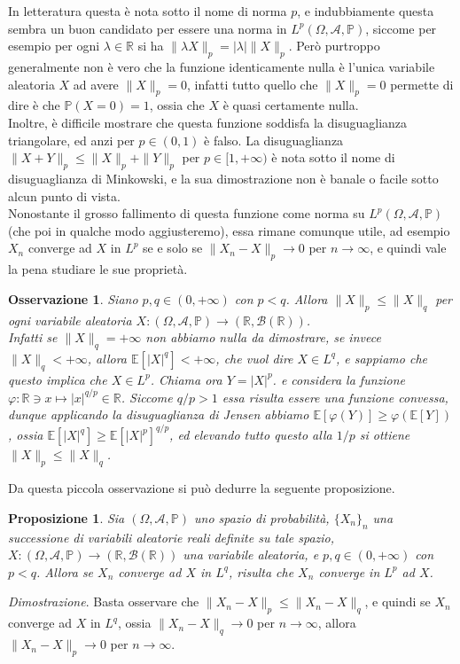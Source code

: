 \documentclass[11pt]{book}
\makeatletter
\theoremstyle{Definizione}
\theoremstyle{TeoremaProposizioneLemmaCorollario}
\newtheorem{mypropo}[myteo]{Proposizione}
\theoremstyle{OsservazioneNota}
\newtheorem{myobs}{Osservazione}[section]
\renewenvironment{proof}[1][\proofname]{\par
  \normalfont \topsep6\p@\@plus6\p@\relax
  \trivlist
  \item[\hskip\labelsep
        \itshape
    #1\@addpunct{.}]\ignorespaces
}{%
  \endtrivlist\@endpefalse
}
\newcommand{\R}{\mathbb{R}}
\renewcommand{\P}{\mathbb{P}}
\newcommand{\E}{\mathbb{E}}
\renewenvironment{proof}{\textsl{Dimostrazione}.}{}
\makeatother
\begin{document}
\noindent
In letteratura questa è nota sotto il nome di norma $p$, e indubbiamente questa sembra un buon candidato per essere una norma in $L^p(\Omega,\mathcal{A},\P)$, siccome per esempio per ogni $\lambda\in \R$ si ha $\| \lambda X\|_p = |\lambda| \|X\|_p$. Però purtroppo generalmente non è vero che la funzione identicamente nulla è l'unica variabile aleatoria $X$ ad avere $\|X\|_p = 0$, infatti tutto quello che $\|X\|_p = 0$ permette di dire è che $\P(X = 0) = 1$, ossia che $X$ è quasi certamente nulla.\\
Inoltre, è difficile mostrare che questa funzione soddisfa la disuguaglianza triangolare, ed anzi per $p\in (0,1)$ è falso. La disuguaglianza $\|X+Y\|_p \leq \|X\|_p+\|Y\|_p$ per $p\in [1,+\infty)$ è nota sotto il nome di disuguaglianza di Minkowski, e la sua dimostrazione non è banale o facile sotto alcun punto di vista.\\
Nonostante il grosso fallimento di questa funzione come norma su $L^p(\Omega,\mathcal{A},\P)$ (che poi in qualche modo aggiusteremo), essa rimane comunque utile, ad esempio $X_n$ converge ad $X$ in $L^p$ se e solo se $\|X_n-X\|_p \to 0$ per $n\to \infty$, e quindi vale la pena studiare le sue proprietà.
\begin{myobs}
Siano $p,q\in (0,+\infty)$ con $p<q$. Allora $\|X\|_p \leq \|X\|_q$ per ogni variabile aleatoria $X:(\Omega,\mathcal{A},\P) \longrightarrow (\R,\mathcal{B}(\R))$.\\
Infatti se $\|X\|_q = +\infty$ non abbiamo nulla da dimostrare, se invece $\|X\|_q < +\infty$, allora $\E[|X|^q] < +\infty$, che vuol dire $X\in L^q$, e sappiamo che questo implica che $X \in L^p$. Chiama ora $Y = |X|^p$. e considera la funzione $\varphi : \R \ni x \longmapsto |x|^{q/p}\in \R$. Siccome $q/p > 1$ essa risulta essere una funzione convessa, dunque applicando la disuguaglianza di Jensen abbiamo $\E[\varphi(Y)] \geq \varphi(\E[Y])$, ossia $\E[|X|^q] \geq \E[|X|^p]^{q/p}$, ed elevando tutto questo alla $1/p$ si ottiene $\|X\|_p \leq \| X\|_q$.
\end{myobs}
Da questa piccola osservazione si può dedurre la seguente proposizione.
\begin{boxpro}
\begin{mypropo}
Sia $(\Omega,\mathcal{A},\P)$ uno spazio di probabilità, $\{X_n\}_n$ una successione di variabili aleatorie reali definite su tale spazio, $X:(\Omega,\mathcal{A},\P)\longrightarrow (\R,\mathcal{B}(\R))$ una variabile aleatoria, e $p,q\in (0,+\infty)$ con $p<q$. Allora se $X_n$ converge ad $X$ in $L^q$, risulta che $X_n$ converge in $L^p$ ad $X$.
\end{mypropo}
\tcblower
\begin{proof}
Basta osservare che $\|X_n-X\|_p \leq \|X_n-X\|_q$, e quindi se $X_n$ converge ad $X$ in $L^q$, ossia $\|X_n - X \|_q \to 0$ per $n\to \infty$, allora $\|X_n-X\|_p \to 0$ per $n\to\infty$.
\end{proof}
\end{boxpro}
\end{document}
